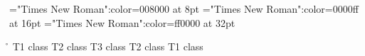 \font\tctbta="Times New Roman":color=008000 at 8pt
\font\tbta="Times New Roman":color=0000ff at 16pt
\font\ta="Times New Roman":color=ff0000 at 32pt
 \r\n
\ta T1 class 
\tbta T2 class \tctbta T3 class \tbta T2 class \ta T1 class 

\bye
